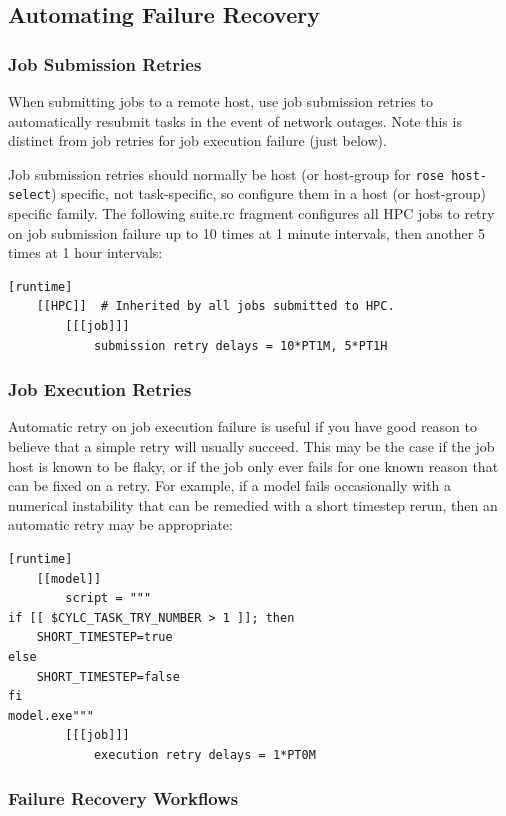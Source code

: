 \subsection{Automating Failure Recovery}

\subsubsection{Job Submission Retries}

When submitting jobs to a remote host, use job submission retries to
automatically resubmit tasks in the event of network outages. Note this is
distinct from job retries for job execution failure (just below).

Job submission retries should normally be host (or host-group for
\lstinline=rose host-select=) specific, not task-specific, so configure them in
a host (or host-group) specific family. The following suite.rc fragment
configures all HPC jobs to retry on job submission failure up to 10
times at 1 minute intervals, then another 5 times at 1 hour intervals:

\lstset{language=suiterc}
\begin{lstlisting}
[runtime]
    [[HPC]]  # Inherited by all jobs submitted to HPC.
        [[[job]]]
            submission retry delays = 10*PT1M, 5*PT1H
\end{lstlisting}

\subsubsection{Job Execution Retries}

Automatic retry on job execution failure is useful if you have good reason to
believe that a simple retry will usually succeed. This may be the case if the
job host is known to be flaky, or if the job only ever fails for one known
reason that can be fixed on a retry. For example, if a model fails occasionally
with a numerical instability that can be remedied with a short timestep rerun,
then an automatic retry may be appropriate:

\lstset{language=suiterc}
\begin{lstlisting}
[runtime]
    [[model]]
        script = """
if [[ $CYLC_TASK_TRY_NUMBER > 1 ]]; then
    SHORT_TIMESTEP=true
else
    SHORT_TIMESTEP=false
fi
model.exe"""
        [[[job]]]
            execution retry delays = 1*PT0M
\end{lstlisting}

\subsubsection{Failure Recovery Workflows}

